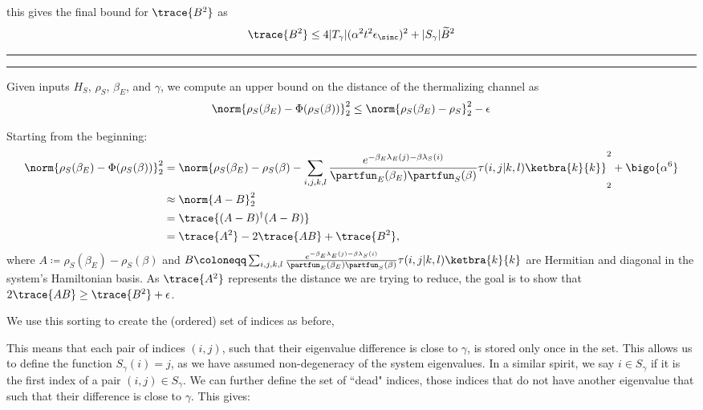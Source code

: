     this gives the final bound for $\trace{B^2}$ as
    \begin{equation}
        \trace{B^2} \leq 4 |T_{\gamma}| (\alpha^2 t^2 \epsilon_{\sinc})^2 + |S_{\gamma}| \widetilde{B}^2
    \end{equation}
    
    
    
    \newpage
    \noindent\rule{\textwidth}{1pt}
    \noindent\rule{\textwidth}{1pt}
    
    \begin{claim}
        Given inputs $H_S$, $\rho_S$, $\beta_E$, and $\gamma$, we compute an upper bound on the distance of the thermalizing channel as
        \begin{align}
            \norm{\rho_S(\beta_E) - \Phi(\rho_S(\beta))}_2^2 \leq \norm{\rho_S(\beta_E) - \rho_S}_2^2 - \epsilon
        \end{align}
        
    \end{claim}
    
    
    Starting from the beginning:
    \begin{align}
        \norm{\rho_S(\beta_E) - \Phi(\rho_S(\beta))}_2^2 &= \norm{\rho_S(\beta_E) - \rho_S(\beta) - \sum_{i,j,k,l} \frac{e^{-\beta_E \lambda_E(j) - \beta \lambda_S(i)}}{\partfun_E(\beta_E) \partfun_S(\beta)} \tau(i,j|k,l) \ketbra{k}{k} }_2^2 + \bigo{\alpha^6} \\
        &\approx \norm{A - B}_2^2 \\
        &= \trace{(A - B)^\dagger (A - B)} \\
        &= \trace{A^2} - 2 \trace{A B} + \trace{B^2},
    \end{align}
    where $A \coloneqq \rho_S(\beta_E) - \rho_S(\beta)$ and $B \coloneqq \sum_{i,j,k,l} \frac{e^{-\beta_E \lambda_E(j) - \beta \lambda_S(i)}}{\partfun_E(\beta_E) \partfun_S(\beta)} \tau(i,j|k,l) \ketbra{k}{k} $ are Hermitian and diagonal in the system's Hamiltonian basis. As $\trace{A^2}$ represents the distance we are trying to reduce, the goal is to show that $2 \trace{AB} \geq \trace{B^2} + \epsilon$. 
    
    We use this sorting to create the (ordered) set of indices as before,
    
    This means that each pair of indices $(i,j)$, such that their eigenvalue difference is close to $\gamma$, is stored only once in the set. This allows us to define the function $S_\gamma(i) = j$, as we have assumed non-degeneracy of the system eigenvalues. In a similar spirit, we say $i \in S_{\gamma}$ if it is the first index of a pair $(i,j) \in S_{\gamma}$. We can further define the set of ``dead" indices, those indices that do not have another eigenvalue that such that their difference is close to $\gamma$. This gives:
    
